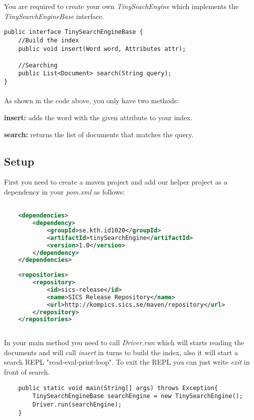 \documentclass[11pt]{article}
\begin{document}
You are required to create your own \textit{TinySeachEngine} which implements the \textit{TinySearchEngineBase} interface.

\begin{lstlisting}
public interface TinySearchEngineBase {
    //Build the index
    public void insert(Word word, Attributes attr);
        
    //Searching
    public List<Document> search(String query);
}
\end{lstlisting}

\paragraph{}
As shown in the code above, you only have two methods:
\begin{description}
\item \textbf{insert:} adds the word with the given attribute to your index.
\item \textbf{search:} returns the list of documents that matches the query.
\end{description}

\newpage
\subsection{Setup}
First you need to create a maven project and add our helper project as a dependency in your \textit{pom.xml} as follows:

\begin{lstlisting}[language=XML]

    <dependencies>
        <dependency>
            <groupId>se.kth.id1020</groupId>
            <artifactId>tinySearchEngine</artifactId>
            <version>1.0</version>
        </dependency>
    </dependencies>
    
    <repositories>
        <repository>
            <id>sics-release</id>
            <name>SICS Release Repository</name>
            <url>http://kompics.sics.se/maven/repository</url>
        </repository>
    </repositories>
    
\end{lstlisting}

In your main method you need to call \textit{Driver.run} which will starts reading the documents and will call \textit{insert} in turns to build the index, also it will start a  search REPL "read-eval-print-loop". To exit the REPL you can just write \textit{exit} in front of search.

\begin{lstlisting}
    public static void main(String[] args) throws Exception{
        TinySearchEngineBase searchEngine = new TinySearchEngine();
        Driver.run(searchEngine);
    }
\end{lstlisting}
\end{document}
